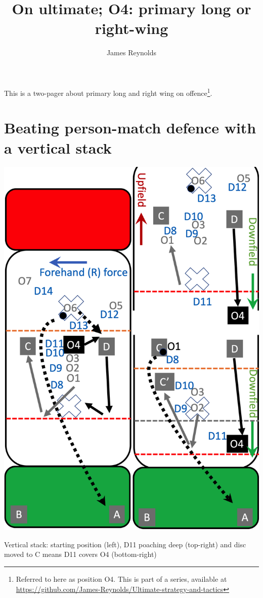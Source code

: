 \documentclass{tufte-handout}
\title{On ultimate; O4: primary long or right-wing}
\author[James Reynolds]{James Reynolds}
\begin{document}
\maketitle%
This is 
a two-pager 
about
primary long and 
right wing on offence\footnote{
Referred to here 
as position O4. 
This
is part of a series, 
available at
\url{https://github.com/James-Reynolds/Ultimate-strategy-and-tactics}}. 

\section{Beating person-match defence with a vertical stack}\label{sec:vertical}

\begin{marginfigure}%
  \includegraphics[width=\linewidth]{O4-vertical}
  \caption{Vertical stack: 
  starting position (left),
  D11 poaching deep (top-right) 
  and disc moved to C means D11 
  covers O4 (bottom-right)}
  \label{fig:O4-vertical}
\end{marginfigure}
\end{document}
